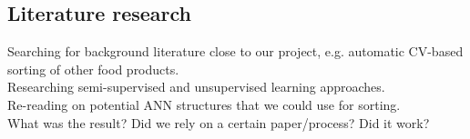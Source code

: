 \subsection{Literature research}

Searching for background literature close to our project, e.g. automatic CV-based sorting of other food products. \\
Researching semi-supervised and unsupervised learning approaches. \\
Re-reading on potential ANN structures that we could use for sorting. \\
What was the result? Did we rely on a certain paper/process? Did it work?

